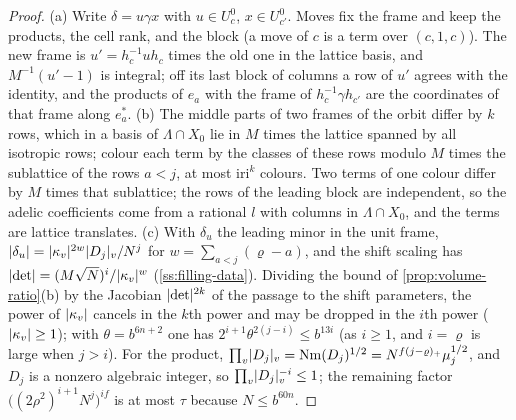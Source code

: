 \begin{proof}
(a) Write $\delta=u\gamma x$ with $u\in U^0_c$, $x\in U^0_{c'}$. Moves fix the frame and keep the products, the cell rank, and the block (a move of $c$ is a term over $(c,1,c)$). The new frame is $u'=h_c^{-1}uh_c$ times the
old one in the lattice basis, and $M^{-1}(u'-1)$ is integral; off its last block of columns a row of $u'$ agrees with the identity, and the products of $e_a$ with the frame of $h_c^{-1}\gamma h_{c'}$ are the coordinates
of that frame along $e^*_a$. (b) The middle parts of two frames of the orbit differ by $k$ rows, which in a basis of $\Lambda\cap X_0$ lie in $M$ times the lattice spanned by all isotropic rows; colour each term by the
classes of these rows modulo $M$ times the sublattice of the rows $a<j$, at most $\mathrm{iri}^k$ colours. Two terms of one colour differ by $M$ times that sublattice; the rows of the leading block are independent, so the
adelic coefficients come from a rational $l$ with columns in $\Lambda\cap X_0$, and the terms are lattice translates. (c) With $\delta_u$ the leading minor in the unit frame, $\lvert \delta_u\rvert=\lvert \kappa_v\rvert^{2w}\lvert D_j\rvert_v/N^j$
for $w=\sum_{a<j}(\varrho-a)$, and the shift scaling has $\lvert \det\rvert=(M\sqrt N)^i/\lvert \kappa_v\rvert^w$ (\cref{ss:filling-data}). Dividing the bound of \cref{prop:volume-ratio}(b) by the Jacobian $\lvert \det\rvert^{2k}$ of the passage to the shift
parameters, the power of $\lvert \kappa_v\rvert$ cancels in the $k$th power and may be dropped in the $i$th power ($\lvert \kappa_v\rvert\ge1$); with $\theta=b^{6n+2}$ one has $2^{i+1}\theta^{2(j-i)}\le b^{13i}$ (as $i\ge1$, and $i=\varrho$ is
large when $j>i$). For the product, $\prod_v\lvert D_j\rvert_v=\mathrm{Nm}(D_j)^{1/2}=N^{f(j-\varrho)_+}\mu_j^{1/2}$, and $D_j$ is a nonzero algebraic integer, so $\prod_v\lvert D_j\rvert_v^{-i}\le1$; the remaining factor
$\bigl((2\rho^2)^{i+1}N^j\bigr)^{if}$ is at most $\tau$ because $N\le b^{60n}$.
\end{proof}

